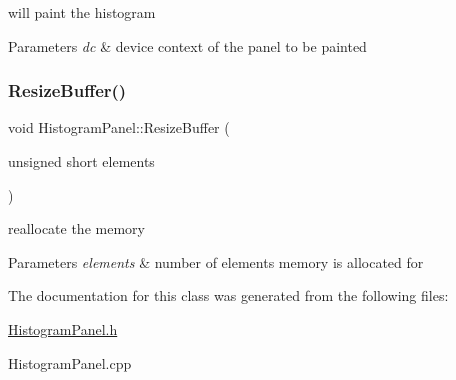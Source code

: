 will paint the histogram 


\begin{DoxyParams}{Parameters}
{\em dc} & device context of the panel to be painted \\
\hline
\end{DoxyParams}
\mbox{\label{classHistogramPanel_ac9dfa965b82be4b009d95eddb9b15417}} 
\subsubsection{\texorpdfstring{Resize\+Buffer()}{ResizeBuffer()}}
{\footnotesize\ttfamily void Histogram\+Panel\+::\+Resize\+Buffer (\begin{DoxyParamCaption}\item[{unsigned short}]{elements }\end{DoxyParamCaption})\hspace{0.3cm}{\ttfamily [private]}}



reallocate the memory 


\begin{DoxyParams}{Parameters}
{\em elements} & number of elements memory is allocated for \\
\hline
\end{DoxyParams}


The documentation for this class was generated from the following files\+:\begin{DoxyCompactItemize}
\item 
\hyperlink{HistogramPanel_8h}{Histogram\+Panel.\+h}\item 
Histogram\+Panel.\+cpp\end{DoxyCompactItemize}
